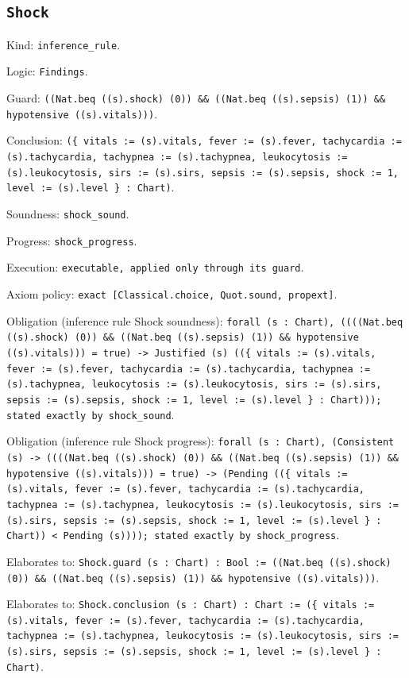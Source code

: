 \documentclass[11pt]{article}
\begin{document}
\subsection*{\texttt{Shock}}
\noindent Kind: \texttt{inference_rule}.\par
\noindent Logic: \texttt{Findings}.\par
\noindent Guard: \texttt{((Nat.beq ((s).shock) (0)) \&\& ((Nat.beq ((s).sepsis) (1)) \&\& hypotensive ((s).vitals)))}.\par
\noindent Conclusion: \texttt{(\{ vitals := (s).vitals, fever := (s).fever, tachycardia := (s).tachycardia, tachypnea := (s).tachypnea, leukocytosis := (s).leukocytosis, sirs := (s).sirs, sepsis := (s).sepsis, shock := 1, level := (s).level \} : Chart)}.\par
\noindent Soundness: \texttt{shock\_sound}.\par
\noindent Progress: \texttt{shock\_progress}.\par
\noindent Execution: \texttt{executable, applied only through its guard}.\par
\noindent Axiom policy: \texttt{exact [Classical.choice, Quot.sound, propext]}.\par
\noindent Obligation (inference rule Shock soundness): \texttt{forall (s : Chart), ((((Nat.beq ((s).shock) (0)) \&\& ((Nat.beq ((s).sepsis) (1)) \&\& hypotensive ((s).vitals))) = true) -> Justified (s) ((\{ vitals := (s).vitals, fever := (s).fever, tachycardia := (s).tachycardia, tachypnea := (s).tachypnea, leukocytosis := (s).leukocytosis, sirs := (s).sirs, sepsis := (s).sepsis, shock := 1, level := (s).level \} : Chart))); stated exactly by shock\_sound}.\par
\noindent Obligation (inference rule Shock progress): \texttt{forall (s : Chart), (Consistent (s) -> ((((Nat.beq ((s).shock) (0)) \&\& ((Nat.beq ((s).sepsis) (1)) \&\& hypotensive ((s).vitals))) = true) -> (Pending ((\{ vitals := (s).vitals, fever := (s).fever, tachycardia := (s).tachycardia, tachypnea := (s).tachypnea, leukocytosis := (s).leukocytosis, sirs := (s).sirs, sepsis := (s).sepsis, shock := 1, level := (s).level \} : Chart)) < Pending (s)))); stated exactly by shock\_progress}.\par
\noindent Elaborates to: \texttt{Shock.guard (s : Chart) : Bool := ((Nat.beq ((s).shock) (0)) \&\& ((Nat.beq ((s).sepsis) (1)) \&\& hypotensive ((s).vitals)))}.\par
\noindent Elaborates to: \texttt{Shock.conclusion (s : Chart) : Chart := (\{ vitals := (s).vitals, fever := (s).fever, tachycardia := (s).tachycardia, tachypnea := (s).tachypnea, leukocytosis := (s).leukocytosis, sirs := (s).sirs, sepsis := (s).sepsis, shock := 1, level := (s).level \} : Chart)}.\par
\end{document}
